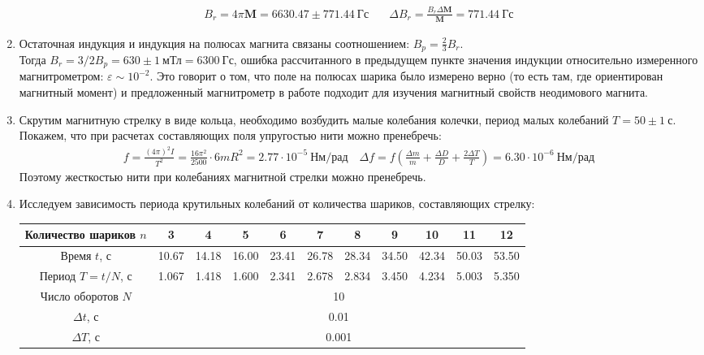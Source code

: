 \documentclass[a4paper, 10pt]{article}
\begin{document}
\begin{enumerate}
\begin{align*}
        {B_{r}} = 4\pi\mathbf{M} = 6630.47\pm 771.44\ \text{Гс} & \quad \Delta {B_{r}} = \frac{{B_{r}}\Delta \mathbf{M}}{\mathbf{M}} = 771.44\ \text{Гс}
    \end{align*}
    \item Остаточная индукция и индукция на полюсах магнита связаны соотношением: ${B_{p}} = \frac{2}{3}{B_{r}}$.\\ 
    Тогда ${B_{r}} = 3/2B_{p} = 630\pm 1\ \text{мТл} = 6300\ \text{Гс}$, ошибка рассчитанного в предыдущем пункте значения индукции относительно измеренного магнитрометром: $\varepsilon \sim 10^{-2}$. Это говорит о том, что
    поле на полюсах шарика было измерено верно (то есть там, где ориентирован магнитный момент) и предложенный магнитрометр в работе подходит для изучения магнитный свойств
    неодимового магнита.
    \item Скрутим магнитную стрелку в виде кольца, необходимо возбудить малые колебания колечки, период малых колебаний $T = 50\pm 1\ \text{с}$. Покажем, что при расчетах составляющих поля упругостью нити можно пренебречь:
    \begin{align*}
        f = \frac{(4\pi)^{2} I}{T^{2}} = \frac{16\pi^{2}}{2500}\cdot 6mR^{2} = 2.77\cdot 10^{-5}\ \text{Нм/рад} \quad \Delta f = f \left(\frac{\Delta m}{m} + \frac{\Delta D}{D} + \frac{2\Delta T}{T}\right) = 6.30\cdot 10^{-6}\ \text{Нм/рад}
    \end{align*}
    Поэтому жесткостью нити при колебаниях магнитной стрелки можно пренебречь.
    \item Исследуем зависимость периода крутильных колебаний от количества шариков, составляющих стрелку:
    \begin{center}
        \begin{tabular}{|c|c|c|c|c|c|c|c|c|c|c|}
            \hline
            Количество шариков $n$ & 3 & 4 & 5 & 6 & 7 & 8 & 9 & 10 & 11 & 12\\
            \hline
            Время $t$, с & 10.67 & 14.18 & 16.00 & 23.41 & 26.78 & 28.34 & 34.50 & 42.34 & 50.03 & 53.50\\
            Период $T = t/N$, с & 1.067 & 1.418 & 1.600 & 2.341 & 2.678 & 2.834 & 3.450 & 4.234 & 5.003 & 5.350\\
            \hline
            Число оборотов $N$ & \multicolumn{10}{|c|}{10}\\
            $\Delta t$, с & \multicolumn{10}{|c|}{0.01}\\
            $\Delta T$, с & \multicolumn{10}{|c|}{0.001}\\
            \hline

\end{tabular}
\end{center}
\end{enumerate}
\end{document}
